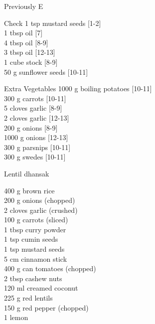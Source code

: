\begin{menu}{Previously E}
\begin{shoppinglist}{Check}
      1 tsp mustard seeds 
        {\scriptsize[1-2]}\\
      1 tbsp oil 
        {\scriptsize[7]}\\
      4 tbsp oil 
        {\scriptsize[8-9]}\\
      3 tbsp oil 
        {\scriptsize[12-13]}\\
      1 cube stock 
        {\scriptsize[8-9]}\\
      50 g sunflower seeds 
        {\scriptsize[10-11]}\\
      \end{shoppinglist}%
      \begin{shoppinglist}{Extra Vegetables}
      1000 g boiling potatoes 
        {\scriptsize[10-11]}\\
      300 g carrots 
        {\scriptsize[10-11]}\\
      5 cloves garlic 
        {\scriptsize[8-9]}\\
      2 cloves garlic 
        {\scriptsize[12-13]}\\
      200 g onions 
        {\scriptsize[8-9]}\\
      1000 g onions 
        {\scriptsize[12-13]}\\
      300 g parsnips 
        {\scriptsize[10-11]}\\
      300 g swedes 
        {\scriptsize[10-11]}\\
      \end{shoppinglist}%
      \par\vfil %
    \vfil\clearpage
  
    \begin{recipe}{2}{Lentil dhansak}%
    
		\begin{ingredients}
		400 g brown rice  \\
	200 g onions (chopped) \\
	2 cloves garlic (crushed) \\
	100 g carrots (sliced) \\
	1 tbsp curry powder  \\
	1 tsp cumin seeds  \\
	1 tsp mustard seeds  \\
	5 cm cinnamon stick  \\
	400 g can tomatoes (chopped) \\
	2 tbsp cashew nuts  \\
	120 ml creamed coconut  \\
	225 g red lentils  \\
	150 g red pepper (chopped) \\
	1  lemon  \\
	

\end{ingredients}
\end{recipe}
\end{menu}
